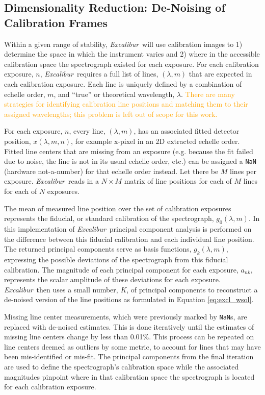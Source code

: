 \documentclass[modern]{aastex63}
\newcommand{\project}[1]{\textsl{#1}}
\newcommand{\name}{\project{Excalibur}}
\newcommand{\code}[1]{\texttt{#1}}
\newcommand{\lz}[1]{\textcolor{orange}{#1}}
\begin{document}
\subsection{Dimensionality Reduction: De-Noising of Calibration Frames} \label{sec:denoising}
Within a given range of stability, \name\ will use calibration images to  1) determine the space in which the instrument varies and 2) where in the accessible calibration space the spectrograph existed for each exposure.  For each calibration exposure, $n$, \name\ requires a full list of lines, $(\lambda,m)$ that are expected in each calibration exposure.  Each line is uniquely defined by a combination of echelle order, $m$, and ``true'' or theoretical wavelength, $\lambda$.  \lz{There are many strategies for identifying calibration line positions and matching them to their assigned wavelengths; this problem is left out of scope for this work.}

For each exposure, $n$, every line, $(\lambda,m)$, has an associated fitted detector position, $x(\lambda,m,n)$, for example x-pixel in an 2D extracted echelle order.  Fitted line centers that are missing from an exposure (e.g. because the fit failed due to noise, the line is not in its usual echelle order, etc.) can be assigned a \code{NaN} (hardware not-a-number) for that echelle order instead.  Let there be $M$ lines per exposure.  \name\ reads in a $N \times M$ matrix of line positions for each of $M$ lines for each of $N$ exposures.

The mean of measured line position over the set of calibration exposures represents the fiducial, or standard calibration of the spectrograph, $g_0(\lambda,m)$.  In this implementation of \name\, principal component analysis is performed on the difference between this fiducial calibration and each individual line position.  The returned principal components serve as basis functions,  $g_k(\lambda,m)$, expressing the possible deviations of the spectrograph from this fiducial calibration.  The magnitude of each principal component for each exposure, $a_{nk}$, represents the scalar amplitude of these deviations for each exposure.  \name\ then uses a small number, $K$, of principal components to reconstruct a de-noised version of the line positions as formulated in Equation \ref{eq:excl_wsol}.

Missing line center measurements, which were previously marked by \code{NaN}s, are replaced with de-noised estimates.  This is done iteratively until the estimates of missing line centers change by less than 0.01\%.  This process can be repeated on line centers deemed as outliers by some metric, to account for lines that may have been mis-identified or mis-fit.  The principal components from the final iteration are used to define the spectrograph's calibration space while the associated magnitudes pinpoint where in that calibration space the spectrograph is located for each calibration exposure.
\end{document}
